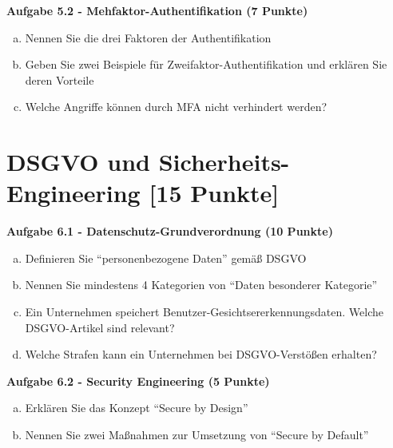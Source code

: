 \documentclass[12pt,a4paper]{article}
\begin{document}
\vspace{3cm}

\textbf{Aufgabe 5.2 - Mehfaktor-Authentifikation (7 Punkte)}

\begin{enumerate}[(a)]
    \item Nennen Sie die drei Faktoren der Authentifikation
    
    \item Geben Sie zwei Beispiele für Zweifaktor-Authentifikation und erklären Sie deren Vorteile
    
    \item Welche Angriffe können durch MFA nicht verhindert werden?
\end{enumerate}

\vspace{3cm}


\newpage

\section{DSGVO und Sicherheits-Engineering [15 Punkte]}

\textbf{Aufgabe 6.1 - Datenschutz-Grundverordnung (10 Punkte)}

\begin{enumerate}[(a)]
    \item Definieren Sie ``personenbezogene Daten'' gemäß DSGVO
    
    \item Nennen Sie mindestens 4 Kategorien von ``Daten besonderer Kategorie''
    
    \item Ein Unternehmen speichert Benutzer-Gesichtsererkennungsdaten. Welche DSGVO-Artikel sind relevant?
    
    \item Welche Strafen kann ein Unternehmen bei DSGVO-Verstößen erhalten?
\end{enumerate}

\vspace{3cm}

\textbf{Aufgabe 6.2 - Security Engineering (5 Punkte)}

\begin{enumerate}[(a)]
    \item Erklären Sie das Konzept ``Secure by Design''
    
    \item Nennen Sie zwei Maßnahmen zur Umsetzung von ``Secure by Default''
\end{enumerate}
\end{document}
